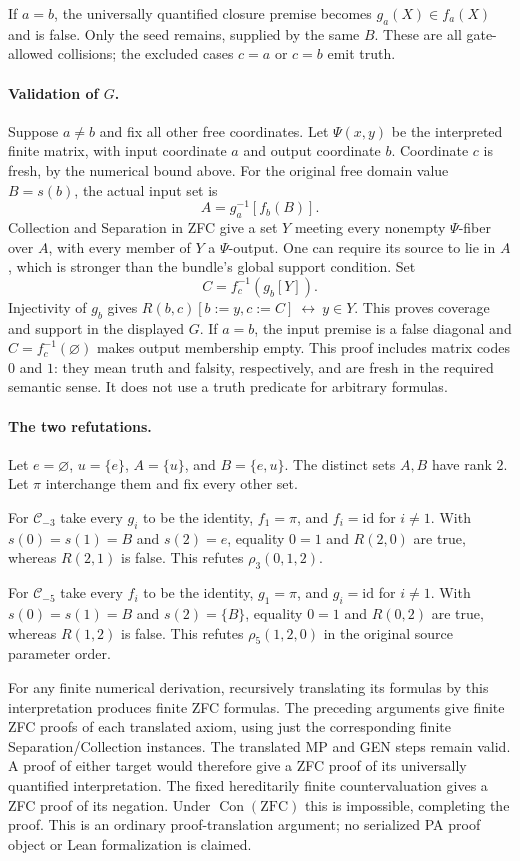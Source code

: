 If $a=b$, the universally quantified closure premise becomes
$g_a(X)\in f_a(X)$ and is false. Only the seed remains, supplied by
the same $B$. These are all gate-allowed collisions; the excluded
cases $c=a$ or $c=b$ emit truth.

\paragraph{Validation of $G$.}
Suppose $a\ne b$ and fix all other free coordinates. Let $\Psi(x,y)$
be the interpreted finite matrix, with input coordinate $a$ and output
coordinate $b$. Coordinate $c$ is fresh, by the numerical bound above.
For the original free domain value $B=s(b)$, the actual input set is
\[
 A=g_a^{-1}[f_b(B)].
\]
Collection and Separation in ZFC give a set $Y$ meeting every nonempty
$\Psi$-fiber over $A$, with every member of $Y$ a $\Psi$-output. One
can require its source to lie in $A$, which is stronger than the bundle's
global support condition. Set
\[
 C=f_c^{-1}(g_b[Y]).
\]
Injectivity of $g_b$ gives
$R(b,c)[b:=y,c:=C]\ \leftrightarrow\ y\in Y$.
This proves coverage and support in the displayed $G$. If $a=b$, the
input premise is a false diagonal and $C=f_c^{-1}(\varnothing)$ makes
output membership empty. This proof includes matrix codes $0$ and $1$:
they mean truth and falsity, respectively, and are fresh in the required
semantic sense. It does not use a truth predicate for arbitrary formulas.

\paragraph{The two refutations.}
Let $e=\varnothing$, $u=\{e\}$, $A=\{u\}$, and $B=\{e,u\}$.
The distinct sets $A,B$ have rank $2$. Let $\pi$ interchange them and
fix every other set.

For $\mathcal C_{-3}$ take every $g_i$ to be the identity, $f_1=\pi$,
and $f_i=\mathrm{id}$ for $i\ne1$. With
$s(0)=s(1)=B$ and $s(2)=e$, equality $0=1$ and $R(2,0)$ are true,
whereas $R(2,1)$ is false. This refutes $\rho_3(0,1,2)$.

For $\mathcal C_{-5}$ take every $f_i$ to be the identity, $g_1=\pi$,
and $g_i=\mathrm{id}$ for $i\ne1$. With
$s(0)=s(1)=B$ and $s(2)=\{B\}$, equality $0=1$ and $R(0,2)$ are true,
whereas $R(1,2)$ is false. This refutes $\rho_5(1,2,0)$ in the original
source parameter order.

For any finite numerical derivation, recursively translating its formulas
by this interpretation produces finite ZFC formulas. The preceding
arguments give finite ZFC proofs of each translated axiom, using just
the corresponding finite Separation/Collection instances. The translated
MP and GEN steps remain valid. A proof of either target would therefore
give a ZFC proof of its universally quantified interpretation. The fixed
hereditarily finite countervaluation gives a ZFC proof of its negation.
Under $\operatorname{Con}(\mathrm{ZFC})$ this is impossible, completing
the proof. This is an ordinary proof-translation argument; no serialized
PA proof object or Lean formalization is claimed.

